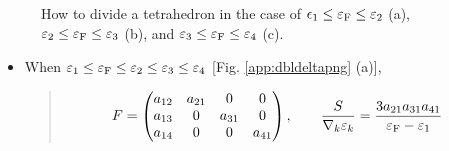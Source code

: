 \documentclass[letterpaper,10pt,pdftex,openany,english]{sphinxmanual}
\begin{document}
\begin{figure}[htbp]
\centering
\capstart

\noindent{}
\caption{How to divide a tetrahedron
in the case of \(\epsilon_1 \leq \varepsilon_{\rm F} \leq \varepsilon_2\) (a),
\(\varepsilon_2 \leq \varepsilon_{\rm F} \leq \varepsilon_3\) (b), and
\(\varepsilon_3 \leq \varepsilon_{\rm F} \leq \varepsilon_4\) (c).}\label{\detokenize{app:id1}}\label{\detokenize{app:dbldeltapng}}\end{figure}
\begin{itemize}
\item {} 
\sphinxAtStartPar
When \(\varepsilon_1 \leq \varepsilon_{\rm F} \leq \varepsilon_2 \leq \varepsilon_3 \leq\varepsilon_4\)
{[}Fig. \ref{app:dbldeltapng} (a){]},
\begin{quote}
\begin{equation*}
\begin{split}\begin{align}
F &=
\begin{pmatrix}
a_{1 2} & a_{2 1} &       0 & 0 \\
a_{1 3} &       0 & a_{3 1} & 0 \\
a_{1 4} &       0 &       0 & a_{4 1}
\end{pmatrix},
\qquad
\frac{S}{\nabla_k \varepsilon_k} = \frac{3 a_{2 1} a_{3 1} a_{4 1}}{\varepsilon_{\rm F} - \varepsilon_1}
\end{align}\end{split}
\end{equation*}\end{quote}


\end{itemize}
\end{document}
